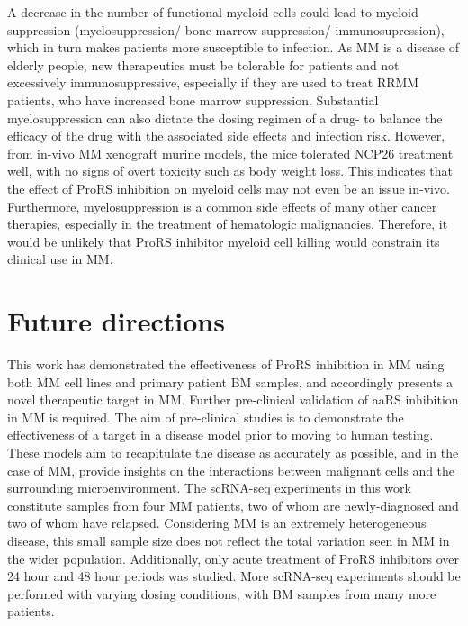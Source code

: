 A decrease in the number of functional myeloid cells could lead to myeloid suppression (myelosuppression/ bone marrow suppression/ immunosupression), which in turn makes patients more susceptible to infection.
As MM is a disease of elderly people, new therapeutics must be tolerable for patients and not excessively immunosuppressive, especially if they are used to treat RRMM patients, who have increased bone marrow suppression.
Substantial myelosuppression can also dictate the dosing regimen of a drug- to balance the efficacy of the drug with the associated side effects and infection risk.
However, from in-vivo MM xenograft murine models\cite{bottpreclinical2022}, the mice tolerated NCP26 treatment well, with no signs of overt toxicity such as body weight loss.
This indicates that the effect of ProRS inhibition on myeloid cells may not even be an issue in-vivo.
Furthermore, myelosuppression is a common side effects of many other cancer therapies, especially in the treatment of hematologic malignancies.
Therefore, it would be unlikely that ProRS inhibitor myeloid cell killing would constrain its clinical use in MM\@.

\section{Future directions}
This work has demonstrated the effectiveness of ProRS inhibition in MM using both MM cell lines and primary patient BM samples, and accordingly presents a novel therapeutic target in MM\@.
Further pre-clinical validation of aaRS inhibition in MM is required.
The aim of pre-clinical studies is to demonstrate the effectiveness of a target in a disease model prior to moving to human testing.
These models aim to recapitulate the disease as accurately as possible, and in the case of MM, provide insights on the interactions between malignant cells and the surrounding microenvironment.
The scRNA-seq experiments in this work constitute samples from four MM patients, two of whom are newly-diagnosed and two of whom have relapsed.
Considering MM is an extremely heterogeneous disease, this small sample size does not reflect the total variation seen in MM in the wider population.
Additionally, only acute treatment of ProRS inhibitors over 24 hour and 48 hour periods was studied.
More scRNA-seq experiments should be performed with varying dosing conditions, with BM samples from many more patients.

